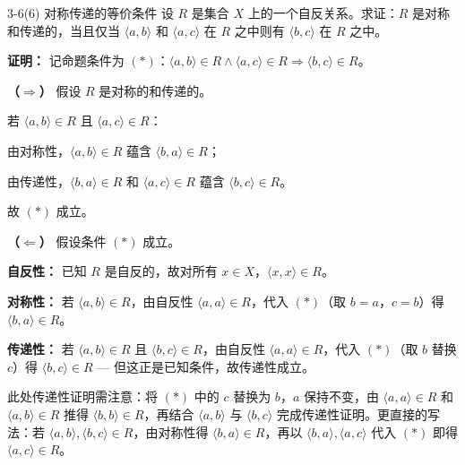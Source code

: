 \documentclass[11pt]{article}
\begin{document}
\begin{question}{3-6(6) 对称传递的等价条件}
  设 $R$ 是集合 $X$ 上的一个自反关系。求证：$R$ 是对称和传递的，当且仅当 $\langle a, b \rangle$ 和 $\langle a, c \rangle$ 在 $R$ 之中则有 $\langle b, c \rangle$ 在 $R$ 之中。

  \begin{answer}
    \textbf{证明：} 记命题条件为 $(*)$：$\langle a,b\rangle \in R \land \langle a,c\rangle \in R \Rightarrow \langle b,c\rangle \in R$。

    \vspace{0.5em}
    \textbf{（$\Rightarrow$）} 假设 $R$ 是对称的和传递的。

    若 $\langle a,b \rangle \in R$ 且 $\langle a,c \rangle \in R$：

    由对称性，$\langle a,b \rangle \in R$ 蕴含 $\langle b,a \rangle \in R$；

    由传递性，$\langle b,a \rangle \in R$ 和 $\langle a,c \rangle \in R$ 蕴含 $\langle b,c \rangle \in R$。

    故 $(*)$ 成立。

    \vspace{0.5em}
    \textbf{（$\Leftarrow$）} 假设条件 $(*)$ 成立。

    \textbf{自反性：} 已知 $R$ 是自反的，故对所有 $x \in X$，$\langle x,x \rangle \in R$。

    \textbf{对称性：} 若 $\langle a,b \rangle \in R$，由自反性 $\langle a,a \rangle \in R$，代入 $(*)$（取 $b=a$，$c=b$）得 $\langle b,a \rangle \in R$。

    \textbf{传递性：} 若 $\langle a,b \rangle \in R$ 且 $\langle b,c \rangle \in R$，由自反性 $\langle a,a \rangle \in R$，代入 $(*)$（取 $b$ 替换 $c$）得 $\langle b,c \rangle \in R$ — 但这正是已知条件，故传递性成立。

    \begin{warn}
      此处传递性证明需注意：将 $(*)$ 中的 $c$ 替换为 $b$，$a$ 保持不变，由 $\langle a,a\rangle \in R$ 和 $\langle a,b\rangle \in R$ 推得 $\langle b,b\rangle \in R$，再结合 $\langle a,b\rangle$ 与 $\langle b,c\rangle$ 完成传递性证明。更直接的写法：若 $\langle a,b\rangle, \langle b,c\rangle \in R$，由对称性得 $\langle b,a\rangle \in R$，再以 $\langle b,a\rangle, \langle a,c\rangle$ 代入 $(*)$ 即得 $\langle a,c\rangle \in R$。
    \end{warn}
  \end{answer}
\end{question}
\end{document}
